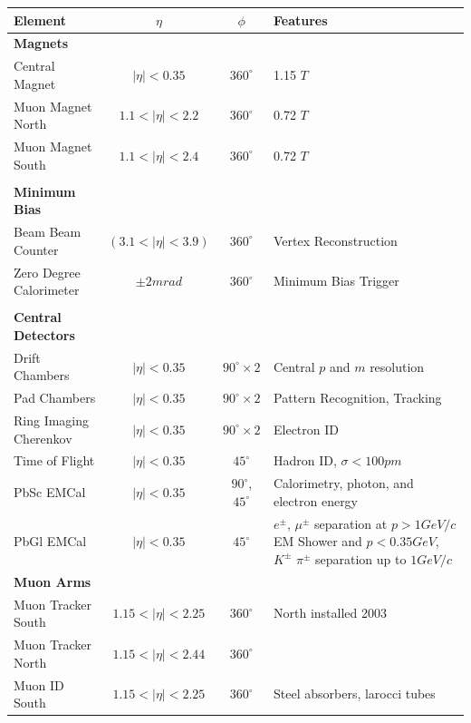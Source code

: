 \begin{table}
  \centering
  \begin{tabular}{l c c p{5cm}}
    \toprule
    \textbf{Element}	& \textbf{$\eta$}	& \textbf{$\phi$} & \textbf{Features} \\
    \midrule
    \textbf{Magnets}  & & & \\
    Central Magnet    & $ \vert\eta\vert < 0.35$ & $360^{\circ}$ & 1.15 $T$ \\ 
    Muon Magnet North & $1.1 < \vert\eta\vert < 2.2$ & $360^{\circ}$ & 0.72 $T$ \\
    Muon Magnet South & $1.1 < \vert\eta\vert < 2.4$ & $360^{\circ}$ & 0.72 $T$ \\
                      & & & \\
    \textbf{Minimum Bias} & & & \\
    Beam Beam Counter & $(3.1 < \vert\eta\vert < 3.9)$ & $360^{\circ}$ & Vertex Reconstruction \\
    Zero Degree Calorimeter & $\pm 2 mrad$ & $360^{\circ}$ & Minimum Bias Trigger \\
                            & & & \\
    \textbf{Central Detectors} & & & \\
    Drift Chambers & $\vert\eta\vert < 0.35$ & $90^{\circ}\times2$ & Central $p$ and $m$ resolution \\
    Pad Chambers & $\vert\eta\vert < 0.35$ & $90^{\circ}\times2$ & Pattern Recognition, Tracking \\
    Ring Imaging Cherenkov & $\vert\eta\vert < 0.35$ & $90^{\circ}\times2$ & Electron ID \\
    Time of Flight & $\vert\eta\vert < 0.35$ & $45^{\circ}$ & Hadron ID, $\sigma<100pm$ \\
    PbSc EMCal & $\vert\eta\vert < 0.35$ & $90^{\circ}$, $45^{\circ}$ & Calorimetry, photon, and electron energy \\
    PbGl EMCal & $\vert\eta\vert < 0.35$ & $45^{\circ}$ & $e^{\pm}$, $\mu^{\pm}$ separation at $p> 1 GeV/c$ EM Shower and $p < 0.35 GeV$, $K^{\pm}$ $\pi^{\pm}$ separation up to $1 GeV/c$ \\
    \textbf{Muon Arms} & & & \\
    Muon Tracker South & $1.15 < \vert\eta\vert < 2.25$ & $360^{\circ}$ & North installed 2003 \\
    Muon Tracker North & $1.15 < \vert\eta\vert < 2.44$   & $360^{\circ}$ &  \\
    Muon ID South & $1.15 < \vert\eta\vert < 2.25$ & $360^{\circ}$ & Steel absorbers, larocci tubes \\

\end{tabular}
\end{table}
